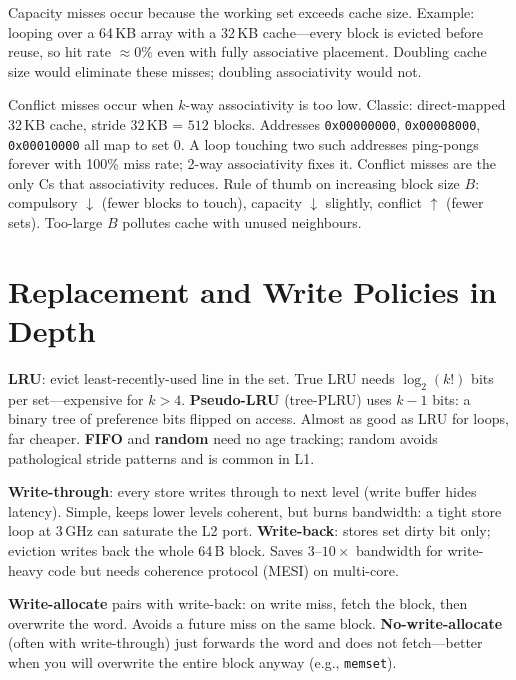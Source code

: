 Capacity misses occur because the working set exceeds cache size. Example: looping over a 64\,KB array with a 32\,KB cache---every block is evicted before reuse, so hit rate $\approx 0\%$ even with fully associative placement. Doubling cache size would eliminate these misses; doubling associativity would not.

Conflict misses occur when $k$-way associativity is too low. Classic: direct-mapped 32\,KB cache, stride $32$\,KB = $512$ blocks. Addresses \texttt{0x00000000}, \texttt{0x00008000}, \texttt{0x00010000} all map to set 0. A loop touching two such addresses ping-pongs forever with 100\% miss rate; 2-way associativity fixes it. Conflict misses are the only Cs that associativity reduces.
Rule of thumb on increasing block size $B$: compulsory $\downarrow$ (fewer blocks to touch), capacity $\downarrow$ slightly, conflict $\uparrow$ (fewer sets). Too-large $B$ pollutes cache with unused neighbours.

\section{Replacement and Write Policies in Depth}
\textbf{LRU}: evict least-recently-used line in the set. True LRU needs $\log_2(k!)$ bits per set---expensive for $k>4$. \textbf{Pseudo-LRU} (tree-PLRU) uses $k-1$ bits: a binary tree of preference bits flipped on access. Almost as good as LRU for loops, far cheaper. \textbf{FIFO} and \textbf{random} need no age tracking; random avoids pathological stride patterns and is common in L1.

\textbf{Write-through}: every store writes through to next level (write buffer hides latency). Simple, keeps lower levels coherent, but burns bandwidth: a tight store loop at 3\,GHz can saturate the L2 port. \textbf{Write-back}: stores set dirty bit only; eviction writes back the whole 64\,B block. Saves $3$--$10\times$ bandwidth for write-heavy code but needs coherence protocol (MESI) on multi-core.

\textbf{Write-allocate} pairs with write-back: on write miss, fetch the block, then overwrite the word. Avoids a future miss on the same block. \textbf{No-write-allocate} (often with write-through) just forwards the word and does not fetch---better when you will overwrite the entire block anyway (e.g., \texttt{memset}).

